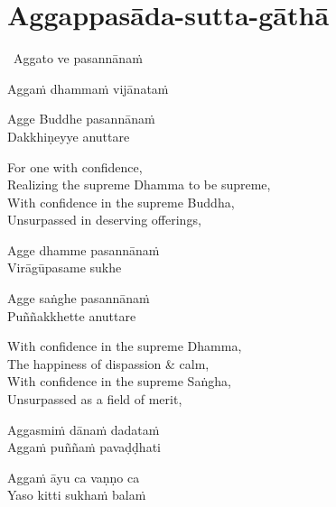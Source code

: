 \suttaRef{[MJG]}

\section{Aggappasāda-sutta-gāthā}
\label{aggappasada-sutta-gatha}

\begin{pali-leader}
  \anglebracketleft\ \hspace{-0.5mm}Aggato ve pasannānaṁ \hspace{-0.5mm}\anglebracketright\
\end{pali-leader}
\begin{pali-hangtogether}
  Aggaṁ dhammaṁ vijānataṁ
\end{pali-hangtogether}
\begin{pali-hangtogether}
  Agge Buddhe pasannānaṁ\\
  Dakkhiṇeyye anuttare
\end{pali-hangtogether}

\begin{english-verses}
  For one with confidence,\\
  Realizing the supreme Dhamma to be supreme,\\
  With confidence in the supreme Buddha,\\
  Unsurpassed in deserving offerings,
\end{english-verses}

\begin{pali-hang}
  Agge dhamme pasannānaṁ\\
  Virāgūpasame sukhe
\end{pali-hang}
\begin{pali-hangtogether}
  Agge saṅghe pasannānaṁ\\
  Puññakkhette anuttare
\end{pali-hangtogether}

\begin{english-verses}
  With confidence in the supreme Dhamma,\\
  The happiness of dispassion \& calm,\\
  With confidence in the supreme Saṅgha,\\
  Unsurpassed as a field of merit,
\end{english-verses}

\begin{pali-hang}
  Aggasmiṁ dānaṁ dadataṁ\\
  Aggaṁ puññaṁ pavaḍḍhati
\end{pali-hang}
\begin{pali-hangtogether}
  Aggaṁ āyu ca vaṇṇo ca\\
  Yaso kitti sukhaṁ balaṁ
\end{pali-hangtogether}

